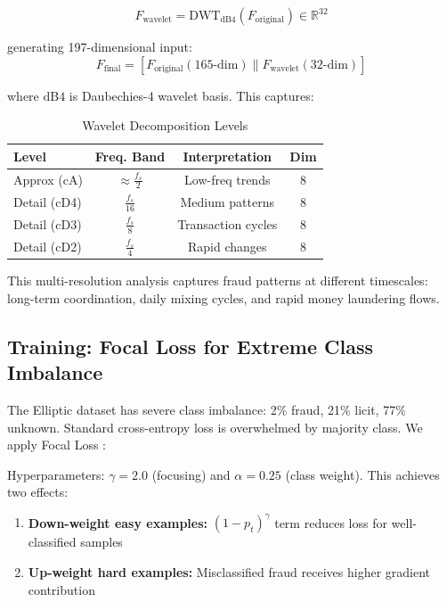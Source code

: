 \documentclass[10pt,conference,compsociety]{IEEEtran}
\begin{document}
\begin{equation}
F_{\text{wavelet}} = \text{DWT}_{\text{dB4}}(F_{\text{original}}) \in \mathbb{R}^{32}
\end{equation}

generating 197-dimensional input:
\begin{equation}
F_{\text{final}} = [F_{\text{original}} (165\text{-dim}) \| F_{\text{wavelet}} (32\text{-dim})]
\end{equation}

where $\text{dB4}$ is Daubechies-4 wavelet basis. This captures:

\begin{table}[!h]
\centering
\caption{Wavelet Decomposition Levels}
\begin{tabular}{lccc}
\toprule
\textbf{Level} & \textbf{Freq. Band} & \textbf{Interpretation} & \textbf{Dim} \\
\midrule
Approx (cA) & $\approx \frac{f_s}{2}$ & Low-freq trends & 8 \\
Detail (cD4) & $\frac{f_s}{16}$ & Medium patterns & 8 \\
Detail (cD3) & $\frac{f_s}{8}$ & Transaction cycles & 8 \\
Detail (cD2) & $\frac{f_s}{4}$ & Rapid changes & 8 \\
\bottomrule
\end{tabular}
\end{table}

This multi-resolution analysis captures fraud patterns at different timescales: long-term coordination, daily mixing cycles, and rapid money laundering flows.

\subsection{Training: Focal Loss for Extreme Class Imbalance}

The Elliptic dataset has severe class imbalance: 2\% fraud, 21\% licit, 77\% unknown. Standard cross-entropy loss is overwhelmed by majority class. We apply Focal Loss \cite{ref8}:
\\[\vspace{0.15cm}
\text{FL}(p_t) = -\alpha_t(1 - p_t)^{\gamma} \log(p_t)
\\]
\vspace{0.15cm}

\noindent Hyperparameters: $\gamma = 2.0$ (focusing) and $\alpha = 0.25$ (class weight). This achieves two effects:

\begin{enumerate}
    \item \textbf{Down-weight easy examples:} $(1-p_t)^{\gamma}$ term reduces loss for well-classified samples
    \item \textbf{Up-weight hard examples:} Misclassified fraud receives higher gradient contribution
\end{enumerate}
\end{document}
